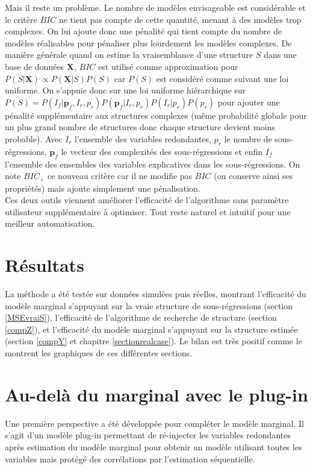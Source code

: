 \documentclass[12pt,a4paper]{report}
\begin{document}
		Mais il reste un problème. Le nombre de modèles envisageable est considérable et le critère $BIC$ ne tient pas compte de cette quantité, menant à des modèles trop complexes. On lui ajoute donc une pénalité qui tient compte du nombre de modèles réalisables pour pénaliser plus lourdement les modèles complexes.
	De manière générale quand on estime la vraisemblance d'une structure $S$ dans une base de données $\boldsymbol{X}$, $BIC$ est utilisé comme approximation pour $P(S|\boldsymbol{X})\propto  P(\boldsymbol{X}|S)P(S)$  	car $P(S)$ est considéré comme suivant une loi uniforme. On s'appuie donc sur une loi uniforme hiérarchique sur $P(S)=P(I_f | \boldsymbol{p}_f,I_r,p_r)P(\boldsymbol{p}_f|I_r,p_r)P(I_r|p_r)P(p_r)$ pour ajouter une pénalité supplémentaire aux structures complexes (même probabilité globale pour un plus grand nombre de structures donc chaque structure devient moins probable). Avec $I_r$ l'ensemble des variables redondantes, $p_r$ le nombre de sous-régressions, $\boldsymbol{p}_f$ le vecteur des complexités des sous-régressions et enfin $I_f$ l'ensemble des ensembles des variables explicatives dans les sous-régressions.
On note $BIC_+$ ce nouveau critère car il ne modifie pas $BIC$ (on conserve ainsi ses propriétés) mais ajoute simplement une pénalisation.\\
	Ces deux outils viennent améliorer l'efficacité de l'algorithme sans paramètre utilisateur supplémentaire à optimiser. Tout reste naturel et intuitif pour une meilleur automatisation.

	\section{Résultats}
		La méthode a été testée sur données simulées puis réelles, montrant l'efficacité du modèle marginal s'appuyant sur la vraie structure de sous-régressions (section \ref{MSEvraiS}), l'efficacité de l'algorithme de recherche de structure (section \ref{compZ}), et l'efficacité du modèle marginal s'appuyant sur la structure estimée (section \ref{compY} et chapitre \ref{sectionrealcase}). Le bilan est très positif comme le montrent les graphiques de ces différentes sections.
	\section{Au-delà du marginal avec le plug-in}
		Une première perspective a été développée pour compléter le modèle marginal. Il s'agit d'un modèle plug-in permettant de ré-injecter les variables redondantes après estimation du modèle marginal pour obtenir un modèle utilisant toutes les variables mais protégé des corrélations par l'estimation séquentielle.
		
\end{document}
